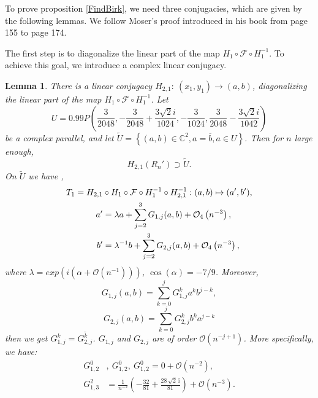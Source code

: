 \documentclass{article}
\numberwithin{figure}{section}
\numberwithin{equation}{section}
\newtheorem{lemma}{Lemma}
\theoremstyle{remark}
\theoremstyle{definition}
\begin{document}
To prove proposition \ref{FindBirk}, we need three conjugacies, which are given by the following lemmas. We follow Moser's proof introduced in his book \cite{moser_invariant_1962} from page 155 to page 174.

The first step is to diagonalize the linear part of the map $H_1 \circ \mathcal{F} \circ H_1^{-1}$. To achieve this goal, we introduce a complex linear conjugacy.
\begin{lemma}
	There is a linear conjugacy $H_{2,1}:\ (x_1,y_1) \rightarrow (a,b)$, diagonalizing the linear part of the map $H_1\circ \mathcal{F}\circ H_1^{-1}$. Let 
	\begin{equation}\label{domain of a}
		U=0.99P\left(	\frac{3}{2048},  -\frac{3}{2048}+\frac{3\sqrt{2}i}{1024}, -\frac{3}{1024},  \frac{3}{2048}-\frac{3\sqrt{2}i}{1042}\right)
	\end{equation}
    be a complex parallel, and let $\widetilde{U}=\left\{(a,b)\in \mathbb{C}^2, a=\overline{b}, a\in U\right\}$.
    Then for $n$ large enough,
	 $$H_{2,1}\left(R_n'\right)\supset \widetilde{U}.$$ 
	On $\widetilde{U}$ we have ,
	\begin{align}\label{formab}
		 T_1=H_{2,1}&\circ H_1\circ \mathcal{F} \circ H_1^{-1}\circ H_{2,1}^{-1}: (a,b)\mapsto (a',b'),\notag\\
		a'&=\lambda a + \sum_{j = 2}^{3}{G_{1,j}(a,b)}+\mathcal{O}_4\left( n^{- 3} \right),\notag\\
		b'&=\lambda^{- 1}b + \sum_{j = 2}^{3}{G_{2,j}(a,b)}+\mathcal{ O}_4\left( n^{- 3} \right),
	\end{align}
	where \(\lambda = exp(i(\alpha + \mathcal{O}\left( n^{- 1} \right)))\),
	\(\cos(\alpha) = -7/9\). Moreover,
	$$G_{1,j}(a,b) = \sum_{k = 0}^{j }{G_{1,j}^{k}a^{k}b^{j - k}},$$
	$$G_{2,j}(a,b) = \sum_{k = 0}^{j }{G_{2,j}^{k}b^{k}a^{j  - k}}$$
	then we get \(G_{1,j}^{k} = \overline{G_{2,j}^{k}}\). \(G_{1,j}\) and
	\(G_{2,j}\) are of order \(\mathcal{O}\left( n^{- j+1} \right)\).
	More specifically, we have: 
	\begin{equation}\label{Gij}
    \begin{split}
		G_{1,2}^{0}&,\ G_{1,2}^{0},\ G_{1,2}^{0}=0+\mathcal{O}\left(n^{-2}\right),\\
		G_{1,3}^2&=\frac{1}{n^{-2}}\left(-\frac{32}{81}+\frac{28\,\sqrt{2}\,\mathrm{i}}{81}\right)+\mathcal{O}\left(n^{-3}\right).
        \end{split}
	\end{equation}
	
\end{lemma}
\end{document}
